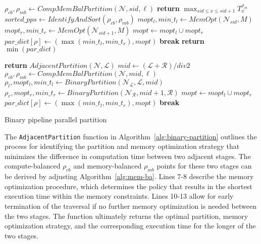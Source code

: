 \begin{algorithm}
  {
    $\rho_{cb},\rho_{mb} \leftarrow CompMemBalPartition(\mathcal{N}, sid, \ell)$\;
    {
      \textbf{return} $\max_{sid \le x \le sid+1} T_x^{\rho_{cb}}$\;
    }
    $sorted\_pps \leftarrow IdentifyAndSort(\rho_{cb},\rho_{mb})$\;
    {
      $mopt_l,min\_t_l \leftarrow MemOpt(\mathcal{N}_{sid},M)$\;
      $mopt_r,min\_t_r \leftarrow MemOpt(\mathcal{N}_{sid+1},M)$\;
      $mopt \leftarrow mopt_l \cup mopt_r$\;
      $par\_dict[\rho] \leftarrow (\max(min\_t_l,min\_t_r),mopt)$\;
      {
        \textbf{break}\;
      }
    }
    \textbf{return} $\min(par\_dict)$
  }
  
  {
    {
      \textbf{return} $AdjacentPartition(\mathcal{N},\mathcal{L})$\;
    }
    $mid \leftarrow (\mathcal{L}+\mathcal{R}) /div 2$\;
    $\rho_{cb},\rho_{mb} \leftarrow CompMemBalPartition(\mathcal{N}, mid, \ell)$\;
    {
      $\rho_l,mopt_l,min\_t_l \leftarrow BinaryPartition(\mathcal{N}_{\mathcal{L}},\mathcal{L},mid)$\;
      $\rho_r,mopt_r,min\_t_r \leftarrow BinaryPartition(\mathcal{N}_{\mathcal{R}},mid+1,\mathcal{R})$\;
      $mopt \leftarrow mopt_l \cup mopt_r$\;
      $par\_dict[\rho] \leftarrow (\max(min\_t_l,min\_t_r),mopt)$\;
      {
        \textbf{break}\;
      }
    }
  }
\caption{Binary pipeline parallel partition}
\label{alg:binary-partition}
\end{algorithm}

The \texttt{AdjacentPartition} function in Algorithm~\ref{alg:binary-partition}
outlines the process for identifying the partition and memory optimization strategy
that minimizes the difference in computation time between two adjacent stages.
The compute-balanced $\rho_{cb}$ and memory-balanced $\rho_{mb}$ points
for these two stages can be derived by adjusting Algorithm~\ref{alg:mem-ba}.
Lines 7-8 describe the memory optimization procedure,
which determines the policy that results in the shortest execution time within the memory constraints.
Lines 10-13 allow for early termination of the traversal if no further memory optimization is needed between the two stages.
The function ultimately returns the optimal partition, memory optimization strategy,
and the corresponding execution time for the longer of the two stages.

